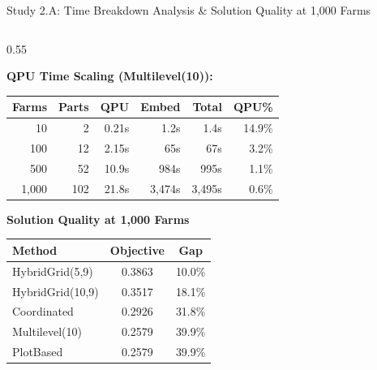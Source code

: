 \documentclass[aspectratio=169,10pt]{beamer}
\begin{document}
\begin{frame}{Study 2.A: Time Breakdown Analysis \& Solution Quality at 1,000 Farms}
\vspace{-0.8cm}
    \begin{columns}[T]

        \begin{column}{0.55\textwidth}

            \small\textbf{QPU Time Scaling (Multilevel(10)):}

            \vspace{0.2cm}
            \begin{table}[h]\scriptsize
                \centering
                \begin{tabular}{rrrrrr}
                    \toprule
                    \textbf{Farms} & \textbf{Parts} & \textbf{QPU} & \textbf{Embed} & \textbf{Total} & \textbf{QPU\%} \\
                    \midrule
                    \rowcolor{accentGreen!15} 10 & 2 & 0.21s & 1.2s & 1.4s & 14.9\% \\
                    100 & 12 & 2.15s & 65s & 67s & 3.2\% \\
                    \rowcolor{accentGreen!15} 500 & 52 & 10.9s & 984s & 995s & 1.1\% \\
                    1,000 & 102 & 21.8s & 3,474s & 3,495s & 0.6\% \\
                    \bottomrule
                \end{tabular}
            \end{table}

            


            \small\textbf{Solution Quality at 1,000 Farms}

\vspace{0.2cm}
\begin{table}[h]\small
    \centering
    \begin{tabular}{lcc}
        \toprule
        \textbf{Method} & \textbf{Objective} & \textbf{Gap} \\
        \midrule
        HybridGrid(5,9) & 0.3863 & 10.0\% \\
        HybridGrid(10,9) & 0.3517 & 18.1\% \\
        Coordinated & 0.2926 & 31.8\% \\
        \rowcolor{accentGreen!10} Multilevel(10) & 0.2579 & 39.9\% \\
        PlotBased & 0.2579 & 39.9\% \\
        \bottomrule
    \end{tabular}
\end{table}


\end{column}
\end{columns}
\end{frame}
\end{document}
